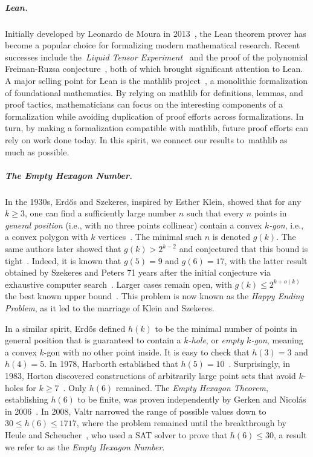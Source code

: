 \subparagraph*{Lean.}
Initially developed by Leonardo de Moura in 2013~\cite{demouraLeanTheoremProver2015},
the Lean theorem prover has become a popular choice for formalizing modern mathematical research.
Recent successes include the~\emph{Liquid Tensor Experiment}~\cite{Castelvecchi2021}
and the proof of the polynomial Freiman-Ruzsa conjecture~\cite{gowers2023conjecture, slomanATeamMathProves2023},
both of which brought significant attention to Lean.
A major selling point for Lean is the \textsf{mathlib} project~\cite{The_mathlib_Community_2020},
a monolithic formalization of foundational mathematics.
By relying on \textsf{mathlib} for definitions, lemmas, and proof tactics,
mathematicians can focus on the interesting components of a formalization
while avoiding duplication of proof efforts across formalizations.
In turn, by making a formalization compatible with \textsf{mathlib},
future proof efforts can rely on work done today.
In this spirit, we connect our results to~\textsf{mathlib} as much as possible.

\subparagraph*{The Empty Hexagon Number.}
In the 1930s,
Erd\H{o}s and Szekeres, inspired by Esther Klein, showed that for any $k \geq 3$,
one can find a sufficiently large number $n$
such that every $n$ points in \emph{general position}
(i.e., with no three points collinear)
contain a convex \emph{$k$-gon}, i.e., a convex polygon with $k$ vertices~\cite{35erdos_combinatorial_problem_geometry}.
The minimal such $n$ is denoted $g(k)$.
The same authors later showed that $g(k) > 2^{k-2}$
and conjectured that this bound is tight~\cite{60erdos_some_extremum_problems_elementary_geometry}.
Indeed, it is known that $g(5) = 9$ and $g(6) = 17$,
with the latter result obtained by Szekeres and Peters 71 years after the initial conjecture
via exhaustive computer search~\cite{06szekeres_computer_solution_17_point_erdos_szekeres_problem}.
Larger cases remain open,
with $g(k) \leq 2^{k+o(k)}$ the best known upper bound~\cite{suk2017erdos,holmsen2017two}.
This problem is now known as the \emph{Happy Ending Problem},
as it led to the marriage of Klein and Szekeres.

In a similar spirit,
Erd\H{o}s defined $h(k)$
to be the minimal number of points in general position
that is guaranteed to contain a \emph{$k$-hole},
or \emph{empty $k$-gon},
meaning a convex $k$-gon with no other point inside.
It is easy to check that $h(3) = 3$ and $h(4) = 5$.
In 1978, Harborth established that $h(5) = 10$~\cite{Harborth1978}.
Surprisingly, in 1983, Horton discovered constructions of arbitrarily large point sets that 
avoid $k$-holes for $k \geq 7$~\cite{hortonSetsNoEmpty1983}.
Only $h (6)$ remained.
The \emph{Empty Hexagon Theorem},
establishing $h(6)$ to be finite,
was proven independently by Gerken and Nicolás in 2006~\cite{gerkenEmptyConvexHexagons2008,nicolasEmptyHexagonTheorem2007}.
In 2008, Valtr narrowed the range of possible values down to $30 \leq h(6) \leq 1717$,
where the problem remained until the breakthrough by Heule and Scheucher~\cite{emptyHexagonNumber},
who used a SAT solver to prove that $h(6) \leq 30$,
a result we refer to as the \emph{Empty Hexagon Number}.
